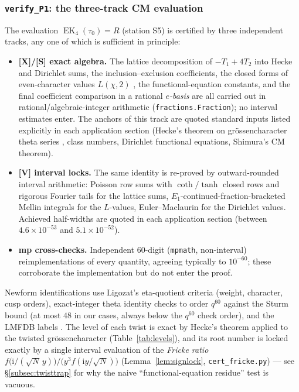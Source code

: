 \documentclass[11pt]{article}
\newcommand{\ii}{\mathrm{i}}
\DeclareMathOperator{\EK}{EK}
\theoremstyle{definition}
\theoremstyle{remark}
\begin{document}
\subsubsection{\texttt{verify\_P1}: the three-track CM evaluation}
\label{subsec:verify}

The evaluation $\EK_4(\tau_0)=R$ (station S5) is certified by three
independent tracks, any one of which is sufficient in principle:
\begin{itemize}
\item \textbf{[X]/[S] exact algebra.} The lattice decomposition of
  $-T_1+4T_2$ into Hecke and Dirichlet sums, the inclusion--exclusion
  coefficients, the closed forms of even-character values
  $L(\chi,2)$ \cite{Wa}, the functional-equation constants, and the
  final coefficient comparison in a rational \emph{$e$-basis} are all
  carried out in rational/algebraic-integer arithmetic
  (\texttt{fractions.Fraction}); no interval estimates enter. The
  anchors of this track are quoted standard inputs listed explicitly
  in each application section (Hecke's theorem on gr\"ossencharacter
  theta series \cite{Miyake}, class numbers, Dirichlet functional
  equations, Shimura's CM theorem).
\item \textbf{[V] interval locks.} The same identity is re-proved by
  outward-rounded interval arithmetic: Poisson row sums with
  $\coth/\tanh$ closed rows and rigorous Fourier tails for the
  lattice sums, $E_1$-continued-fraction-bracketed Mellin integrals
  for the $L$-values, Euler--Maclaurin for the Dirichlet values.
  Achieved half-widths are quoted in each application section
  (between $4.6\times10^{-53}$ and $5.1\times10^{-52}$).
\item \textbf{mp cross-checks.} Independent $60$-digit
  (\texttt{mpmath}, non-interval) reimplementations of every
  quantity, agreeing typically to $10^{-60}$; these corroborate the
  implementation but do not enter the proof.
\end{itemize}
Newform identifications use Ligozat's eta-quotient criteria
\cite{Lig} (weight, character, cusp orders), exact-integer theta
identity checks to order $q^{60}$ against the Sturm bound
\cite{Sturm} (at most $48$ in our cases, always below the $q^{60}$
check order), and the LMFDB
labels \cite{LMFDB}. The level of each twist is exact by Hecke's
theorem applied to the twisted grössencharacter
(Table~\ref{tab:levels}), and its root number is locked exactly by a
single interval evaluation of the \emph{Fricke ratio}
$f\bigl(\ii/(\sqrt N\,y)\bigr)\big/\bigl(y^3 f(\ii y/\sqrt N)\bigr)$
(Lemma~\ref{lem:signlock}, \texttt{cert\_fricke.py}) ---
see \S\ref{subsec:twisttrap} for why
the naive ``functional-equation residue'' test is vacuous.
\end{document}
